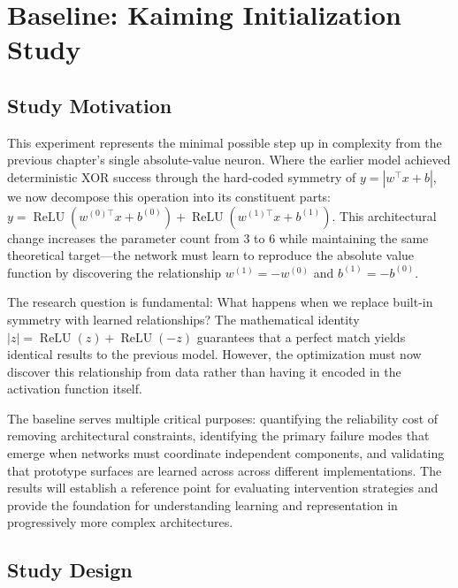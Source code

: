 
\section{Baseline: Kaiming Initialization Study}
\label{sec:relu1-kaiming}


\subsection*{Study Motivation}

This experiment represents the minimal possible step up in complexity from the previous chapter's single absolute-value neuron. Where the earlier model achieved deterministic XOR success through the hard-coded symmetry of $y = |w^{\top}x + b|$, we now decompose this operation into its constituent parts: $y = \operatorname{ReLU}(w^{(0)\top}x + b^{(0)}) + \operatorname{ReLU}(w^{(1)\top}x + b^{(1)})$. This architectural change increases the parameter count from 3 to 6 while maintaining the same theoretical target—the network must learn to reproduce the absolute value function by discovering the relationship $w^{(1)} = -w^{(0)}$ and $b^{(1)} = -b^{(0)}$.

The research question is fundamental: What happens when we replace built-in symmetry with learned relationships? The mathematical identity $|z| = \operatorname{ReLU}(z) + \operatorname{ReLU}(-z)$ guarantees that a perfect match yields identical results to the previous model. However, the optimization must now discover this relationship from data rather than having it encoded in the activation function itself.

The baseline serves multiple critical purposes: quantifying the reliability cost of removing architectural constraints, identifying the primary failure modes that emerge when networks must coordinate independent components, and validating that prototype surfaces are learned across across different implementations. The results will establish a reference point for evaluating intervention strategies and provide the foundation for understanding learning and representation in progressively more complex architectures.


\subsection*{Study Design}

